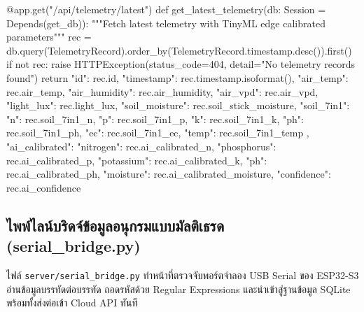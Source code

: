 \begin{pythonbox}
@app.get("/api/telemetry/latest")
def get_latest_telemetry(db: Session = Depends(get_db)):
    """Fetch latest telemetry with TinyML edge calibrated parameters"""
    rec = db.query(TelemetryRecord).order_by(TelemetryRecord.timestamp.desc()).first()
    if not rec:
        raise HTTPException(status_code=404, detail="No telemetry records found")
    return {
        "id": rec.id,
        "timestamp": rec.timestamp.isoformat(),
        "air_temp": rec.air_temp,
        "air_humidity": rec.air_humidity,
        "air_vpd": rec.air_vpd,
        "light_lux": rec.light_lux,
        "soil_moisture": rec.soil_stick_moisture,
        "soil_7in1": {
            "n": rec.soil_7in1_n, "p": rec.soil_7in1_p, "k": rec.soil_7in1_k,
            "ph": rec.soil_7in1_ph, "ec": rec.soil_7in1_ec, "temp": rec.soil_7in1_temp
        },
        "ai_calibrated": {
            "nitrogen": rec.ai_calibrated_n,
            "phosphorus": rec.ai_calibrated_p,
            "potassium": rec.ai_calibrated_k,
            "ph": rec.ai_calibrated_ph,
            "moisture": rec.ai_calibrated_moisture,
            "confidence": rec.ai_confidence
        }
    }
\end{pythonbox}

\newpage
\subsection{ไพพ์ไลน์บริดจ์ข้อมูลอนุกรมแบบมัลติเธรด (serial\_bridge.py)}
ไฟล์ \texttt{server/serial\_bridge.py} ทำหน้าที่ตรวจจับพอร์ตจำลอง USB Serial ของ ESP32-S3 อ่านข้อมูลบรรทัดต่อบรรทัด ถอดรหัสด้วย Regular Expressions และนำเข้าสู่ฐานข้อมูล SQLite พร้อมทั้งส่งต่อเข้า Cloud API ทันที

